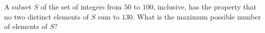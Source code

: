 A subset $S$ of the set of integers from $50$ to $100$, inclusive, has the property that no two distinct elements of $S$ sum to $130$. What is the maximum possible number of elements of $S$?
